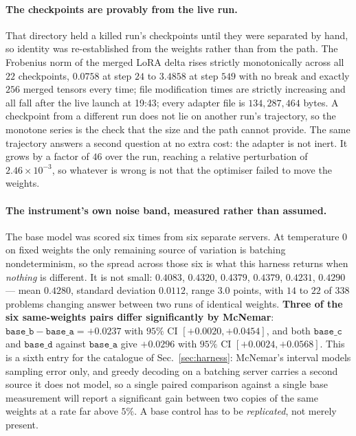 \paragraph{The checkpoints are provably from the live run.} That directory held a killed
run's checkpoints until they were separated by hand, so identity was re-established from the
weights rather than from the path. The Frobenius norm of the merged LoRA delta rises strictly
monotonically across all $22$ checkpoints, $0.0758$ at step $24$ to $3.4858$ at step $549$
with no break and exactly $256$ merged tensors every time; file modification times are
strictly increasing and all fall after the live launch at 19:43; every adapter file is
$134{,}287{,}464$ bytes. A checkpoint from a different run does not lie on another run's
trajectory, so the monotone series is the check that the size and the path cannot provide.
The same trajectory answers a second question at no extra cost: the adapter is not inert.
It grows by a factor of $46$ over the run, reaching a relative perturbation of
$2.46\times10^{-3}$, so whatever is wrong is not that the optimiser failed to move the weights.

\paragraph{The instrument's own noise band, measured rather than assumed.} The base model was
scored six times from six separate servers. At temperature $0$ on fixed weights the only
remaining source of variation is batching nondeterminism, so the spread across those six is
what this harness returns when \emph{nothing} is different. It is not small:
$0.4083$, $0.4320$, $0.4379$, $0.4379$, $0.4231$, $0.4290$ --- mean $0.4280$, standard
deviation $0.0112$, range $3.0$ points, with $14$ to $22$ of $338$ problems changing answer
between two runs of identical weights. \textbf{Three of the six same-weights pairs differ
significantly by McNemar}: $\texttt{base\_b}-\texttt{base\_a}=+0.0237$ with $95\%$ CI
$[+0.0020,+0.0454]$, and both $\texttt{base\_c}$ and $\texttt{base\_d}$ against
$\texttt{base\_a}$ give $+0.0296$ with $95\%$ CI $[+0.0024,+0.0568]$. This is a sixth entry
for the catalogue of Sec.~\ref{sec:harness}: McNemar's interval models sampling error only,
and greedy decoding on a batching server carries a second source it does not model, so a
single paired comparison against a single base measurement will report a significant gain
between two copies of the same weights at a rate far above $5\%$. A base control has to be
\emph{replicated}, not merely present.

